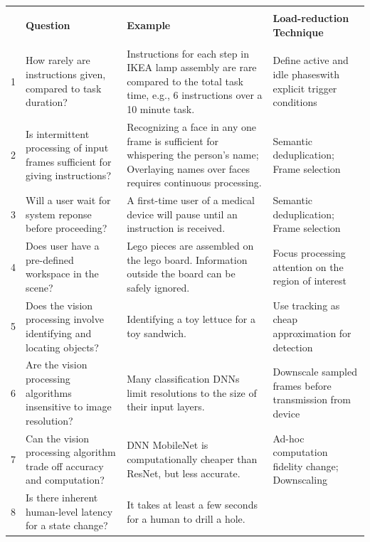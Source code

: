 \begin{table}[]
    \small
    \begin{tabular}{|r|p{35ex}|p{43ex}|p{32ex}|}
    \hline&&&\\[0.1in]
    &{\normalsize\bf Question}  & {\normalsize\bf Example} & {\normalsize\bf Load-reduction Technique} \\
    & & & \\ 
    \hline
    1&How rarely are instructions given, compared to task duration? 
        & Instructions for each step in IKEA lamp assembly are 
            rare compared to the total task time, e.g., 6 instructions over 
            a 10 minute task.
        & Define active and idle phaseswith explicit trigger conditions \\ \hline
    2&Is intermittent processing of input frames sufficient for giving instructions?
        & Recognizing a face in any one frame is sufficient for
whispering the person's name;
            Overlaying names over faces requires 
            continuous processing. 
        & Semantic deduplication; Frame selection   \\ \hline
    3&Will a user wait for system reponse before proceeding?  
        & A first-time user of a medical device will pause until  an instruction is received.
        & Semantic deduplication; Frame selection   \\ \hline
    4&Does user have a pre-defined workspace in the scene?
        & Lego pieces are assembled on the lego board. Information outside the board can
             be safely ignored.
        & Focus processing attention on the region of interest \\ \hline
    5&Does the vision processing involve identifying and locating objects?
        & Identifying a toy lettuce for a toy sandwich.
        & Use tracking as cheap approximation for detection \\ \hline
    6&Are the vision processing algorithms insensitive to image resolution?
        & Many classification DNNs limit resolutions to  
            the size of their input layers.
        & Downscale sampled frames before transmission from device    \\ \hline
    7&Can the vision processing algorithm trade off accuracy and computation? 
        & DNN MobileNet is computationally cheaper than ResNet, but less accurate. 
        & Ad-hoc computation fidelity change; Downscaling   \\ \hline
    8&Is there inherent human-level latency for a state change?
        & It takes at least a few seconds for a human to drill a hole.

\end{tabular}
\end{table}

